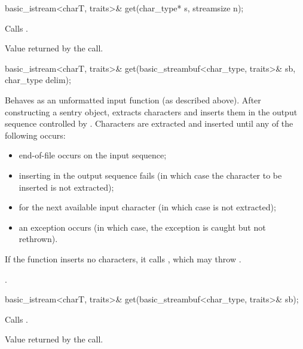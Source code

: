 %
\begin{itemdecl}
basic_istream<charT, traits>& get(char_type* s, streamsize n);
\end{itemdecl}

\begin{itemdescr}
\pnum
\effects
Calls
.

\pnum
\returns
Value returned by the call.
\end{itemdescr}

%
\begin{itemdecl}
basic_istream<charT, traits>& get(basic_streambuf<char_type, traits>& sb, char_type delim);
\end{itemdecl}

\begin{itemdescr}
\pnum
\effects
Behaves as an unformatted input function
(as described above).
After constructing a sentry object, extracts
characters and inserts them
in the output sequence controlled by
.
Characters are extracted and inserted until any of the following occurs:
\begin{itemize}
\item
end-of-file occurs on the input sequence;
\item
inserting in the output sequence fails
(in which case the character to be inserted is not extracted);
\item
{} for the next available input
character 
(in which case  is not extracted);
\item
an exception occurs
(in which case, the exception is caught but not rethrown).
\end{itemize}

\pnum
If the function inserts no characters, it calls
,
which may throw
.

\pnum
\returns
{}.
\end{itemdescr}

%
\begin{itemdecl}
basic_istream<charT, traits>& get(basic_streambuf<char_type, traits>& sb);
\end{itemdecl}

\begin{itemdescr}
\pnum
\effects
Calls
.

\pnum
\returns
Value returned by the call.
\end{itemdescr}

